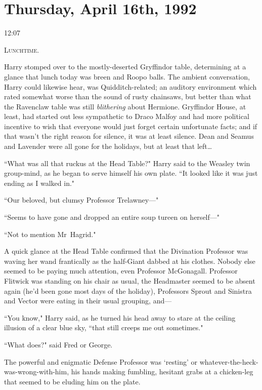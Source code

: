 
\section{Thursday, April 16th, 1992}

12:07\pm

\lettrine{L}{unchtime.}

\hplettrineextrapara
Harry stomped over to the mostly-deserted Gryffindor table, determining at a glance that lunch today was breen and Roopo balls. The ambient conversation, Harry could likewise hear, was Quidditch-related; an auditory environment which rated somewhat worse than the sound of rusty chainsaws, but better than what the Ravenclaw table was still \emph{blithering} about Hermione. Gryffindor House, at least, had started out less sympathetic to Draco Malfoy and had more political incentive to wish that everyone would just forget certain unfortunate facts; and if that wasn't the right reason for silence, it was at least silence. Dean and Seamus and Lavender were all gone for the holidays, but at least that left{\ldots}

``What was all that ruckus at the Head Table?" Harry said to the Weasley twin group-mind, as he began to serve himself his own plate. ``It looked like it was just ending as I walked in."

``Our beloved, but clumsy Professor Trelawney—"

``Seems to have gone and dropped an entire soup tureen on herself—"

``Not to mention Mr~Hagrid."

A quick glance at the Head Table confirmed that the Divination Professor was waving her wand frantically as the half-Giant dabbed at his clothes. Nobody else seemed to be paying much attention, even Professor McGonagall. Professor Flitwick was standing on his chair as usual, the Headmaster seemed to be absent again (he'd been gone most days of the holiday), Professors Sprout and Sinistra and Vector were eating in their usual grouping, and—

``You know," Harry said, as he turned his head away to stare at the ceiling illusion of a clear blue sky, ``that still creeps me out sometimes."

``What does?" said Fred or George.

The powerful and enigmatic Defense Professor was `resting' or whatever-the-heck-was-wrong-with-him, his hands making fumbling, hesitant grabs at a chicken-leg that seemed to be eluding him on the plate.

